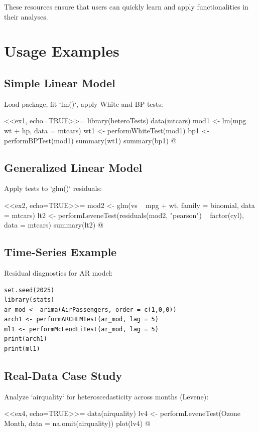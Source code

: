 These resources ensure that users can quickly learn and apply  functionalities in their analyses.

\section{Usage Examples} \label{sec:usage}
\subsection{Simple Linear Model}
Load package, fit `lm()`, apply White and BP tests:
\begin{Schunk}
<<ex1, echo=TRUE>>=
library(heteroTests)
data(mtcars)
mod1 <- lm(mpg ~ wt + hp, data = mtcars)
wt1 <- performWhiteTest(mod1)
bp1 <- performBPTest(mod1)
summary(wt1)
summary(bp1)
@
\end{Schunk}

\subsection{Generalized Linear Model}
Apply tests to `glm()` residuals:
\begin{Schunk}
<<ex2, echo=TRUE>>=
mod2 <- glm(vs ~ mpg + wt, family = binomial, data = mtcars)
lt2 <- performLeveneTest(residuals(mod2, "pearson") ~ factor(cyl), data = mtcars)
summary(lt2)
@
\end{Schunk}

\subsection{Time-Series Example}
Residual diagnostics for AR model:
\begin{verbatim}
set.seed(2025)
library(stats)
ar_mod <- arima(AirPassengers, order = c(1,0,0))
arch1 <- performARCHLMTest(ar_mod, lag = 5)
ml1 <- performMcLeodLiTest(ar_mod, lag = 5)
print(arch1)
print(ml1)
\end{verbatim}

\subsection{Real-Data Case Study}
Analyze `airquality` for heteroscedasticity across months (Levene):
\begin{Schunk}
<<ex4, echo=TRUE>>=
data(airquality)
lv4 <- performLeveneTest(Ozone ~ Month, data = na.omit(airquality))
plot(lv4)
@
\end{Schunk}

